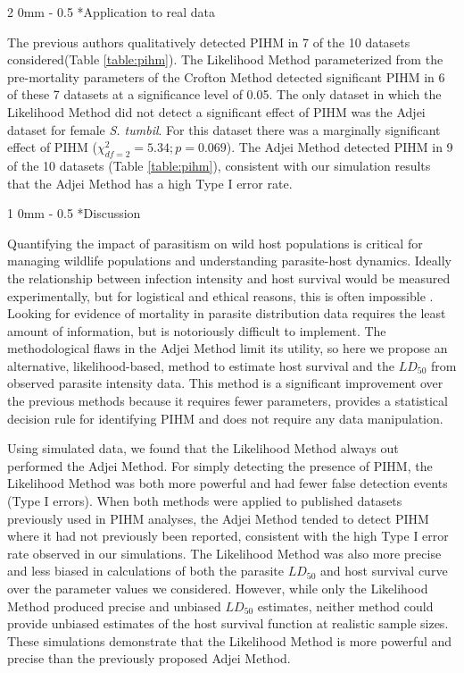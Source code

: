 \documentclass[12pt, a4paper]{article}
\makeatletter
\renewcommand{\section}{\@startsection
{section}%
{1}%
{0mm}%
{-\baselineskip}%
{0.5\baselineskip}%
{\normalfont\bf\large}} %
\renewcommand{\subsection}{\@startsection
{subsection}%
{2}%
{0mm}%
{-\baselineskip}%
{0.5\baselineskip}%
{\normalfont\bf}} %
\makeatother
\begin{document}
\subsection*{Application to real data}

The previous authors qualitatively detected PIHM
in 7 of the 10 datasets considered(Table \ref{table:pihm}).  The Likelihood Method parameterized
from the pre-mortality parameters of the Crofton Method detected significant
PIHM in 6 of these 7 datasets at a significance level of 0.05.  The only
dataset in which the Likelihood Method did not detect a significant effect of PIHM was the Adjei dataset
for female \emph{S. tumbil}.  For this dataset there was a marginally significant effect
of PIHM ($\chi^2_{df=2} = 5.34; p = 0.069$). The Adjei Method detected PIHM in 9 of the 10 datasets (Table \ref{table:pihm}), consistent with our simulation results that the Adjei Method has a high Type I error rate.

\section*{Discussion}


Quantifying the impact of parasitism on wild host populations is critical for managing wildlife populations and understanding parasite-host dynamics. Ideally the relationship between
infection intensity and host survival would be measured experimentally, but for
logistical and ethical reasons, this is often impossible \citep{McCallum2000a}.
Looking for evidence of mortality in parasite distribution data requires the
least amount of information, but is notoriously difficult to implement. The
methodological flaws in the Adjei Method limit its utility, so here we propose
an alternative, likelihood-based, method to estimate host survival and the
$LD_{50}$ from observed parasite intensity data.  This
method is a significant improvement over the previous methods because it requires fewer parameters,
provides a statistical decision rule for identifying PIHM and does not require
any data manipulation.

Using simulated data, we found that the Likelihood Method always out performed the Adjei Method. For simply detecting the presence of PIHM, the Likelihood
Method was both more powerful and had fewer false detection events (Type I
errors).  When both methods were applied to published datasets previously used
in PIHM analyses, the Adjei Method tended to detect PIHM where it had not previously been
reported, consistent with the high Type I error rate observed in our
simulations. The Likelihood Method was also more precise and less
biased in calculations of both the parasite $LD_{50}$ and host survival curve over the parameter values we considered.
However, while only the Likelihood Method produced precise and unbiased $LD_{50}$
estimates, neither method could provide unbiased estimates of the host survival
function at realistic sample sizes.  These simulations demonstrate that
the Likelihood Method is more powerful and precise than the previously proposed Adjei Method.
\end{document}
